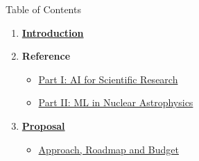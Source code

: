 \setsource{}
\begin{frame}[label=contents]{Table of Contents}
    \begin{enumerate}
        \setlength{\itemsep}{1.3em}
        \item \hyperlink{intro-1}{\textbf{Introduction}}
        \item \textbf{Reference}
        \begin{itemize}
            \setlength{\itemsep}{0.5em}
            \item \hyperlink{md-4}{Part I: AI for Scientific Research}
            \item \hyperlink{md-19}{Part II: ML in Nuclear Astrophysics}
        \end{itemize}
        \item \hyperlink{md-1}{\textbf{Proposal}}
        \begin{itemize}
            \item \hyperlink{md-1}{Approach, Roadmap and Budget}
        \end{itemize}
    \end{enumerate}
\end{frame}

